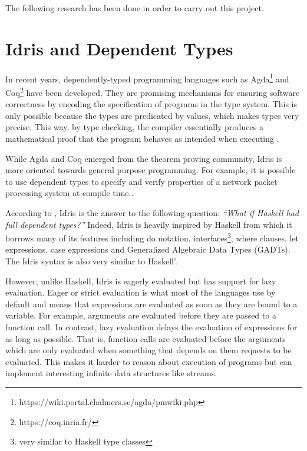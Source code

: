The following research has been done in order to carry out this
project.

\section{Idris and Dependent Types}
In recent years, dependently-typed programming languages such
as Agda\footnote{https://wiki.portal.chalmers.se/agda/pmwiki.php}
and Coq\footnote{https://coq.inria.fr/} have been developed.
They are promising mechanisms for ensuring software correctness
by encoding the specification of programs in the type system.
This is only possible because the types are predicated by values,
which makes types very precise.
This way, by type checking, the compiler essentially produces a
mathematical proof that the program behaves as intended when
executing \citep{brady_2013}.

While Agda and Coq emerged from the theorem proving community,
Idris is more oriented towards general purpose programming. For
example, it is possible to use dependent types to specify and
verify properties of a network packet processing
system at compile time.\citep{systemprog}.




According to \citep{brady_2013}, Idris is the answer to the following
question:
\emph{``What if Haskell had full dependent types?''}
Indeed, Idris is heavily inspired by Haskell from which it
borrows many of its features including do notation,
interfaces\footnote{very similar to Haskell type
    classes}, where clauses, let expressions, case expressions and
Generalized Algebraic Data Types (GADTs).
The Idris syntax is also very similar to Haskell'.

However, unlike Haskell, Idris is eagerly evaluated but has
support for lazy evaluation.
Eager or strict evaluation is what most of the languages
use by default and means that expressions are evaluated
as soon as they are bound to a variable.
For example, arguments are evaluated before they are passed
to a function call.
In contrast, lazy evaluation delays the evaluation of expressions for
as long as possible.
That is, function calls are evaluated before the arguments which
are only evaluated when something that depends on them requests to
be evaluated.
This makes it harder to reason about execution of programs but can
implement interesting infinite data structures like streams.

